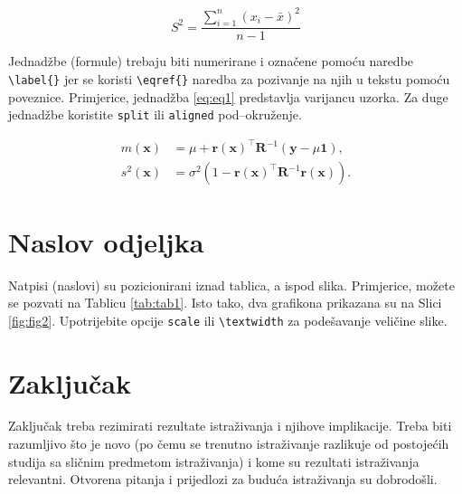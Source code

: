 \documentclass{crebsshr}
\begin{document}
    \begin{equation} \label{eq:eq1}
    S^2=\dfrac{\displaystyle\sum_{i=1}^{n}(x_i-\bar{x})^2}{n-1}
    \end{equation}
    
    {\color{red} Jednadžbe (formule) trebaju biti numerirane i označene pomoću naredbe \verb=\label{}= jer se koristi \verb=\eqref{}= naredba za pozivanje na njih u tekstu pomoću poveznice.} Primjerice, {\color{blue} jednadžba} \eqref{eq:eq1} predstavlja varijancu uzorka. Za duge jednadžbe koristite \verb=split= ili \verb=aligned= pod--okruženje.
    
    \begin{equation} \label{eq:eq2}
    \begin{aligned}
    m(\textbf{x})&=\mu + \textbf{r}(\textbf{x})^\top \textbf{R}^{-1}(\textbf{y} - \mu \textbf{1}), \\
    s^2(\textbf{x})&=\sigma^2 \left(1 - \textbf{r}(\textbf{x})^\top \textbf{R}^{-1}\textbf{r}(\textbf{x}) \right).
    \end{aligned}
    \end{equation}
    
    \section{Naslov odjeljka}
    {\color{red}Natpisi (naslovi) su pozicionirani iznad tablica, a ispod slika.} Primjerice, možete se pozvati na {\color{blue} Tablicu} \ref{tab:tab1}. Isto tako, dva grafikona prikazana su na {\color{blue} Slici} \ref{fig:fig2}. Upotrijebite opcije \verb=scale= ili \verb=\textwidth= za podešavanje veličine slike.
    
    \section{Zaključak}
    Zaključak treba rezimirati rezultate istraživanja i njihove implikacije. Treba biti razumljivo što je novo (po čemu se trenutno istraživanje razlikuje od postojećih studija sa sličnim predmetom istraživanja) i kome su rezultati istraživanja relevantni. Otvorena pitanja i prijedlozi za buduća istraživanja su dobrodošli.
    \vspace{-0.1cm}
\end{document}
